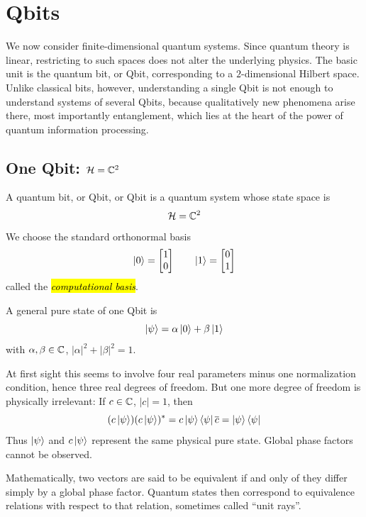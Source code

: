  \clearpage

\section{Qbits}




We now consider finite-dimensional quantum systems.
Since quantum theory is linear, restricting to such spaces does not alter the underlying physics. 
The basic unit is the quantum bit, or Qbit, corresponding to a $2$-dimensional Hilbert space. 
Unlike classical bits, however, understanding a single Qbit is not enough to understand systems of several Qbits, 
because qualitatively new phenomena arise there, most importantly entanglement, which lies at the heart of the power of quantum information processing.

\subsection{One Qbit: $\mathcal{H} = \mathbb{C}^2$}
\label{sec:one-qbit}


A quantum bit, or Qbit, or {Qbit} is a quantum system whose state space is
\[
\mathcal H = \mathbb{C}^2
\]
We choose the standard orthonormal basis
\[
\ket{0}
=
\begin{bmatrix}
1\\0
\end{bmatrix}
\qquad
\ket{1}
=
\begin{bmatrix}
0\\1
\end{bmatrix}
\]
called the \hl{\emph{computational basis}}.

A general pure state of one Qbit is
\[
\ket{\psi}
=
\alpha \ket{0} + \beta \ket{1}
\]
with 
\(
\alpha,\beta \in \mathbb{C}
\),
\(
|\alpha|^2+|\beta|^2=1
\).

At first sight this seems to involve four real parameters minus one normalization condition, hence three real degrees of freedom.
But one more degree of freedom is physically irrelevant:
If $c \in \mathbb{C}$, \(|c|=1\), then
\[
  (c\ket{\psi})(c\ket{\psi})^*
  =
  c\ket{\psi}\bra{\psi}\overline{c}
  =
  \ket{\psi}\bra{\psi}
\]
Thus \(\ket{\psi}\) and \(c\ket{\psi}\) represent the same physical pure state.
Global phase factors cannot be observed.

Mathematically, two vectors are said to be equivalent if and only of they diﬀer simply by a global phase factor. 
Quantum states then correspond to equivalence relations with respect to that relation, sometimes called ``unit rays''. 



